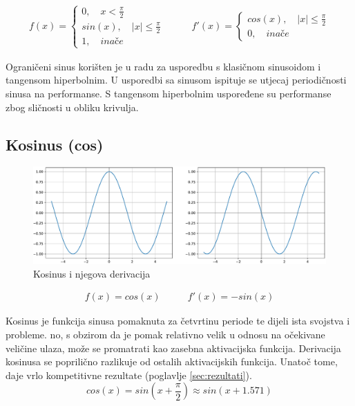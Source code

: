 \documentclass[times, utf8, numeric, diplomski]{fer}
\def\otherwise{\textit{inače}}
\def\secref#1{(poglavlje \ref{#1})}
\begin{document}
\begin{equation}
\label{eq:trsin}
\begin{split}
f(x) =
\begin{cases}
0, \quad x < \frac{\pi}{2} \\
sin(x), \quad |x| \leq \frac{\pi}{2} \\
1, \quad \otherwise
\end{cases}
\end{split}
\qquad
\begin{split}
f'(x) =
\begin{cases}
cos(x), \quad |x| \leq \frac{\pi}{2} \\
0, \quad \otherwise
\end{cases}
\end{split}
\end{equation}

Ograničeni sinus korišten je u radu \citet{taming_waves} za usporedbu s klasičnom sinusoidom i tangensom hiperbolnim. U usporedbi sa sinusom ispituje se utjecaj periodičnosti sinusa na performanse. S tangensom hiperbolnim uspoređene su performanse zbog sličnosti u obliku krivulja.

\subsection{Kosinus (cos)}

\begin{figure}[H]
\includegraphics[width=\textwidth]{func_Cos.pdf}
\centering
\caption{Kosinus i njegova derivacija}
\label{fig:cos}
\end{figure}

\begin{equation}
\label{eq:cos}
\begin{split}
f(x) = cos(x)
\end{split}
\qquad
\begin{split}
f'(x) = -sin(x)
\end{split}
\end{equation}

Kosinus je funkcija sinusa pomaknuta za četvrtinu periode te dijeli ista svojstva i probleme. no, s obzirom da je pomak relativno velik u odnosu na očekivane veličine ulaza, može se promatrati kao zasebna aktivacijska funkcija. Derivacija kosinusa se poprilično razlikuje od ostalih aktivacijskih funkcija. Unatoč tome, daje vrlo kompetitivne rezultate \secref{sec:rezultati}.
\begin{equation}
cos(x) = sin(x + \frac{\pi}{2}) \approx sin(x + 1.571)
\end{equation}
\end{document}
